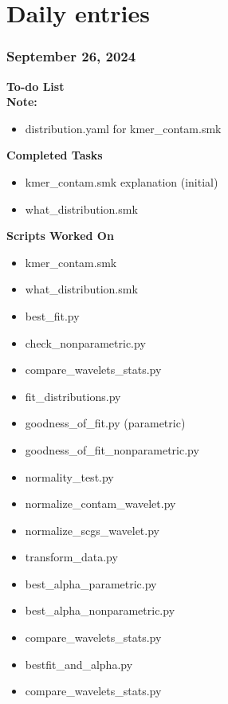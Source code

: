 \documentclass[11pt]{report}
\newcommand{\done}{\checkmark}
\newcommand{\draft}{\faPencil}
\begin{document}
{\newpage






\nolinenumbers
\part{Daily entries}

\pagestyle{fancy}
\fancyhf{}
\fancyhead[C]{\leftmark}  %
\fancyhead[R]{\thepage}

\renewcommand{\thesection}{\arabic{section}}
\setcounter{section}{0}
\setcounter{subsection}{0}

	

\begin{multicols}{2}
\section{September 26, 2024}


\textbf{To-do List} \\
\textbf{Note:} 

\begin{itemize}
	\item [\done] distribution.yaml for kmer\_contam.smk
	
	
\end{itemize}

\textbf{Completed Tasks}
\begin{itemize}
	\item [\done] kmer\_contam.smk explanation (initial)
	\item [\draft] what\_distribution.smk
	
\end{itemize}

\textbf{Scripts Worked On}
\begin{itemize}
	\item kmer\_contam.smk
	\item what\_distribution.smk
	\item best\_fit.py
	\item check\_nonparametric.py
	\item compare\_wavelets\_stats.py
	\item fit\_distributions.py
	\item goodness\_of\_fit.py (parametric)
	\item goodness\_of\_fit\_nonparametric.py
	\item normality\_test.py
	\item normalize\_contam\_wavelet.py
	\item normalize\_scgs\_wavelet.py
	\item transform\_data.py
	\item best\_alpha\_parametric.py
	\item best\_alpha\_nonparametric.py
	\item compare\_wavelets\_stats.py
	\item bestfit\_and\_alpha.py
	\item compare\_wavelets\_stats.py
	

\end{itemize}
\end{multicols}}
\end{document}
